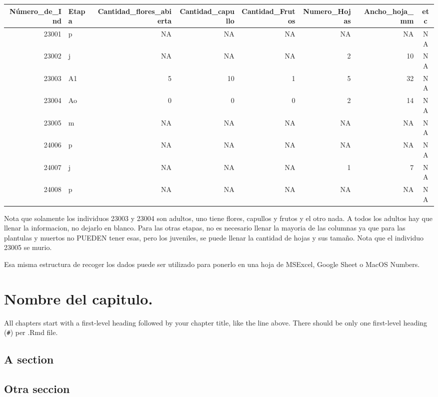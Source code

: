 \documentclass[
]{book}
\theoremstyle{definition}
\theoremstyle{definition}
\theoremstyle{definition}
\theoremstyle{definition}
\theoremstyle{remark}
\begin{document}
\begin{longtable}{rlrrrrrc}
\toprule
Número\_de\_Ind & Etapa & Cantidad\_flores\_abierta & Cantidad\_capullo & Cantidad\_Frutos & Numero\_Hojas & Ancho\_hoja\_mm & etc \\ 
\midrule
23001 & p & NA & NA & NA & NA & NA & NA \\ 
23002 & j & NA & NA & NA & 2 & 10 & NA \\ 
23003 & A1 & 5 & 10 & 1 & 5 & 32 & NA \\ 
23004 & Ao & 0 & 0 & 0 & 2 & 14 & NA \\ 
23005 & m & NA & NA & NA & NA & NA & NA \\ 
24006 & p & NA & NA & NA & NA & NA & NA \\ 
24007 & j & NA & NA & NA & 1 & 7 & NA \\ 
24008 & p & NA & NA & NA & NA & NA & NA \\ 
\bottomrule
\end{longtable}

Nota que solamente los individuos 23003 y 23004 son adultos, uno tiene flores, capullos y frutos y el otro nada. A todos los adultos hay que llenar la informacion, no dejarlo en blanco. Para las otras etapas, no es necesario llenar la mayoria de las columnas ya que para las plantulas y muertos no PUEDEN tener esas, pero los juveniles, se puede llenar la cantidad de hojas y sus tamaño. Nota que el individuo 23005 se murio.

Esa misma estructura de recoger los dados puede ser utilizado para ponerlo en una hoja de MSExcel, Google Sheet o MacOS Numbers.

\hypertarget{intro}{%
\chapter{Nombre del capitulo.}\label{intro}}

All chapters start with a first-level heading followed by your chapter title, like the line above. There should be only one first-level heading (\texttt{\#}) per .Rmd file.

\hypertarget{a-section}{%
\section{A section}\label{a-section}}

\hypertarget{otra-seccion}{%
\section{Otra seccion}\label{otra-seccion}}
\end{document}
